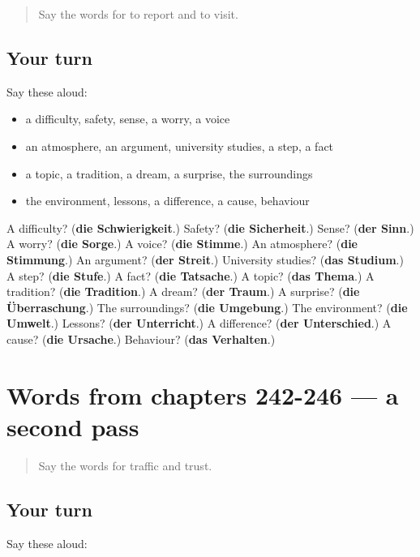 \begin{quote}
Say the words for to report and to visit.
\end{quote}

\subsection*{Your turn}
Say these aloud:

\begin{itemize}
\raggedright
  \item a difficulty, safety, sense, a worry, a voice
  \item an atmosphere, an argument, university studies, a step, a fact
  \item a topic, a tradition, a dream, a surprise, the surroundings
  \item the environment, lessons, a difference, a cause, behaviour
\end{itemize}

\begin{tcolorbox}[breakable,colback=teal!4,colframe=teal!35!black,title={Before you move on}]
A difficulty? (\textbf{die Schwierigkeit}.) Safety? (\textbf{die Sicherheit}.) Sense? (\textbf{der Sinn}.) A worry? (\textbf{die Sorge}.) A voice? (\textbf{die Stimme}.) An atmosphere? (\textbf{die Stimmung}.) An argument? (\textbf{der Streit}.) University studies? (\textbf{das Studium}.) A step? (\textbf{die Stufe}.) A fact? (\textbf{die Tatsache}.) A topic? (\textbf{das Thema}.) A tradition? (\textbf{die Tradition}.) A dream? (\textbf{der Traum}.) A surprise? (\textbf{die Überraschung}.) The surroundings? (\textbf{die Umgebung}.) The environment? (\textbf{die Umwelt}.) Lessons? (\textbf{der Unterricht}.) A difference? (\textbf{der Unterschied}.) A cause? (\textbf{die Ursache}.) Behaviour? (\textbf{das Verhalten}.)
\end{tcolorbox}
\section[(dialogue)]{Words from chapters 242-246 — a second pass}

\label{lesson:GE-R246-second-pass-words-from-chapters-242-246}



\begin{quote}
Say the words for traffic and trust.
\end{quote}

\subsection*{Your turn}
Say these aloud:

